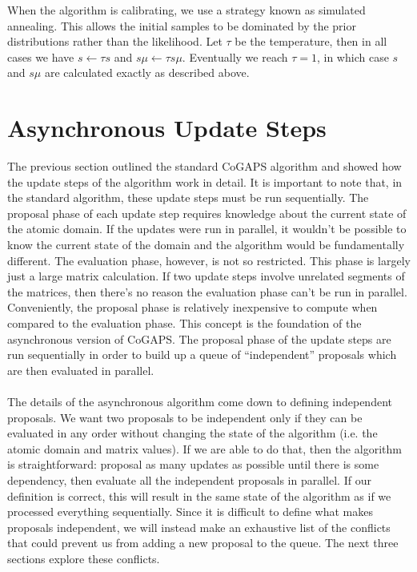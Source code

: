 \documentclass[]{article}
\begin{document}
When the algorithm is calibrating, we use a strategy known as simulated annealing. This allows the initial samples to be dominated by the prior distributions rather than the likelihood. Let $\tau$ be the temperature, then in all cases we have $s \leftarrow \tau s$ and $s\mu \leftarrow \tau s\mu$. Eventually we reach $\tau = 1$, in which case $s$ and $s\mu$ are calculated exactly as described above.

\section{Asynchronous Update Steps}

The previous section outlined the standard CoGAPS algorithm and showed how the update steps of the algorithm work in detail. It is important to note that, in the standard algorithm, these update steps must be run sequentially. The proposal phase of each update step requires knowledge about the current state of the atomic domain. If the updates were run in parallel, it wouldn't be possible to know the current state of the domain and the algorithm would be fundamentally different. The evaluation phase, however, is not so restricted. This phase is largely just a large matrix calculation. If two update steps involve unrelated segments of the matrices, then there's no reason the evaluation phase can't be run in parallel. Conveniently, the proposal phase is relatively inexpensive to compute when compared to the evaluation phase. This concept is the foundation of the asynchronous version of CoGAPS. The proposal phase of the update steps are run sequentially in order to build up a queue of ``independent'' proposals which are then evaluated in parallel.\\
\\
The details of the asynchronous algorithm come down to defining independent proposals. We want two proposals to be independent only if they can be evaluated in any order without changing the state of the algorithm (i.e. the atomic domain and matrix values). If we are able to do that, then the algorithm is straightforward: proposal as many updates as possible until there is some dependency, then evaluate all the independent proposals in parallel. If our definition is correct, this will result in the same state of the algorithm as if we processed everything sequentially. Since it is difficult to define what makes proposals independent, we will instead make an exhaustive list of the conflicts that could prevent us from adding a new proposal to the queue. The next three sections explore these conflicts.
\end{document}
